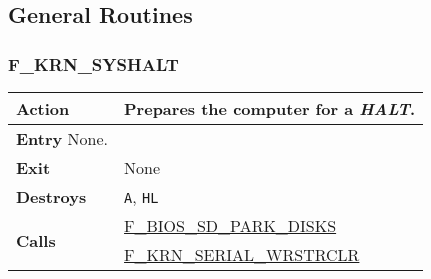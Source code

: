 \subsection{General Routines}

\subsubsection{F\_KRN\_SYSHALT}
\label{func:fkrnsyshalt}
\begin{tabular}{l p{9cm}}
    \hline\multirow[t]{4}{4em}{\textbf{Action}}
    & Prepares the computer for a \textit{HALT}.\\
    \hline\textbf{Entry} None.\\
    \hline\textbf{Exit} & None \\
    \hline\textbf{Destroys} & \texttt{A}, \texttt{HL} \\
    \hline\multirow[t]{2}{4em}{\textbf{Calls}}
    & \hyperref[func:fbiossdparkdisks]{F\_BIOS\_SD\_PARK\_DISKS}\\
    & \hyperref[func:fkrnserialwrstrclr]{F\_KRN\_SERIAL\_WRSTRCLR}\\
    \hline
\end{tabular}